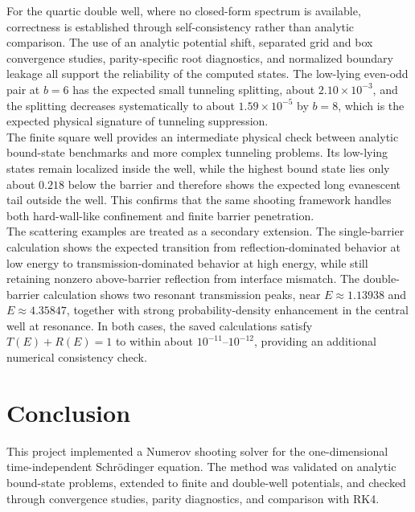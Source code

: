 \documentclass[11pt]{article}
\begin{document}
\begin{refsection}
        For the quartic double well, where no closed-form spectrum is available, correctness is established through self-consistency rather than analytic comparison. The use of an analytic potential shift, separated grid and box convergence studies, parity-specific root diagnostics, and normalized boundary leakage all support the reliability of the computed states. The low-lying even-odd pair at $b=6$ has the expected small tunneling splitting, about $2.10\times10^{-3}$, and the splitting decreases systematically to about $1.59\times10^{-5}$ by $b=8$, which is the expected physical signature of tunneling suppression. \\

        The finite square well provides an intermediate physical check between analytic bound-state benchmarks and more complex tunneling problems. Its low-lying states remain localized inside the well, while the highest bound state lies only about $0.218$ below the barrier and therefore shows the expected long evanescent tail outside the well. This confirms that the same shooting framework handles both hard-wall-like confinement and finite barrier penetration. \\

        The scattering examples are treated as a secondary extension. The single-barrier calculation shows the expected transition from reflection-dominated behavior at low energy to transmission-dominated behavior at high energy, while still retaining nonzero above-barrier reflection from interface mismatch. The double-barrier calculation shows two resonant transmission peaks, near $E\approx1.13938$ and $E\approx4.35847$, together with strong probability-density enhancement in the central well at resonance. In both cases, the saved calculations satisfy $T(E)+R(E)=1$ to within about $10^{-11}$--$10^{-12}$, providing an additional numerical consistency check. \\

    \section{Conclusion}
        This project implemented a Numerov shooting solver for the one-dimensional time-independent Schr\"odinger equation. The method was validated on analytic bound-state problems, extended to finite and double-well potentials, and checked through convergence studies, parity diagnostics, and comparison with RK4. \\


\end{refsection}
\end{document}
